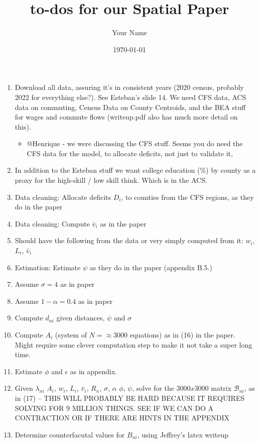 \documentclass{article}
\title{to-dos for our Spatial Paper}
\author{Your Name}
\date{\today}
\begin{document}
\maketitle
\begin{enumerate}
    \item Download all data, assuring it's in consistent years (2020 census, probably 2022 for everything else?). See Esteban's slide 14. We need CFS data, ACS data on commuting, Census Data on County Centroids, and the BEA stuff for wages and commute flows (writeup.pdf also has much more detail on this).
    
    \begin{itemize}
        \item @Henrique - we were discussing the CFS stuff. Seems you do need the CFS data for the model, to allocate deficits, not just to validate it, 
    \end{itemize}
    \item In addition to the Esteban stuff we want college education (\%) by county as a proxy for the high-skill / low skill think. Which is in the ACS. 
    \item Data cleaning: Allocate deficits $D_i$, to counties from the CFS regions, as they do in the paper
    \item Data cleaning: Compute $\bar v_i$ as in the paper 
    \item Should have the following from the data or very simply computed from it: $w_i$, $L_i$, $\bar v_i$
    \item Estimation: Estimate $\psi$ as they do in the paper (appendix B.5.)
    \item Assume $\sigma = 4$ as in paper
    \item Assume $1-\alpha = 0.4$ as in paper
    \item Compute $d_{ni}$ given distances, $\psi$ and $\sigma$
    \item Compute $A_i$ (system of $N = \approx 3000$ equations) as in (16) in the paper. Might require some clever computation step to make it not take a super long time.
    \item Estimate $\phi$ and $\epsilon$ as in appendix. 
    \item Given $\lambda_{ni}$ $A_i$, $w_i$, $L_i$, $\bar v_i$, $R_n$, $\sigma$, $\alpha$ $\phi$, $\psi$, solve for the $3000x3000$ matrix $\mathcal{B}_{ni}$, as in (17) -- THIS WILL PROBABLY BE HARD BECAUSE IT REQUIRES SOLVING FOR 9 MILLION THINGS. SEE IF WE CAN DO A CONTRACTION OR IF THERE ARE HINTS IN THE APPENDIX
    \item Determine counterfacutal values for $B_{ni}$, using Jeffrey's latex writeup

\end{enumerate}
\end{document}
